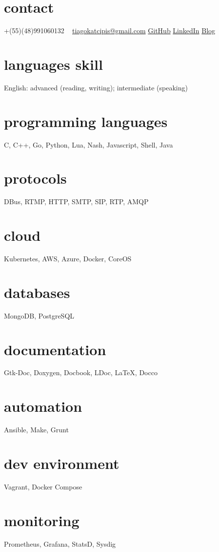 \documentclass[]{friggeri-cv} %
\begin{document}


\begin{aside} %
\section{contact}
+(55)(48)991060132
~
\href{mailto:tiagokatcipis@gmail.com}{tiagokatcipis@gmail.com}
\href{https://github.com/katcipis}{GitHub}
\href{http://www.linkedin.com/pub/tiago-katcipis/1b/273/8b0}{LinkedIn}
\href{http://katcipis.github.io/}{Blog}
\section{languages skill}
English: advanced (reading, writing); intermediate (speaking)
\section{programming languages}
C, C++, Go, Python, Lua, Nash, Javascript, Shell, Java
\section{protocols}
DBus, RTMP, HTTP, SMTP, SIP, RTP, AMQP
\section{cloud}
Kubernetes, AWS, Azure, Docker, CoreOS
\section{databases}
MongoDB, PostgreSQL
\section{documentation}
Gtk-Doc, Doxygen, Docbook, LDoc, LaTeX, Docco
\section{automation}
Ansible, Make, Grunt
\section{dev environment}
Vagrant, Docker Compose
\section{monitoring}
Prometheus, Grafana, StatsD, Sysdig
\end{aside}
\end{document}
